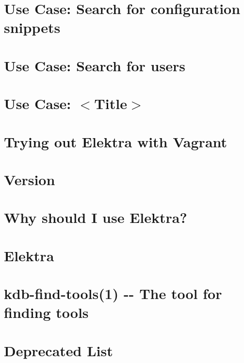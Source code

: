 \documentclass[twoside]{book}
\newcommand{\+}{\discretionary{\mbox{\scriptsize$\hookleftarrow$}}{}{}}
\begin{document}
\chapter{Use Case\+: Search for configuration snippets}
\label{doc_usecases_snippet_sharing_UC_search_snippet_md}

\chapter{Use Case\+: Search for users}
\label{doc_usecases_snippet_sharing_UC_search_user_md}

\chapter{Use Case\+: $<$Title$>$}
\label{doc_usecases_template_md}

\chapter{Trying out Elektra with Vagrant}
\label{doc_vagrant_README_md}

\chapter{Version}
\label{doc_VERSION_md}

\chapter{Why should I use Elektra?}
\label{doc_WHY_md}

\chapter{Elektra}
\label{README_md}

\chapter{kdb-\/find-\/tools(1) -\/-\/ The tool for finding tools}
\label{md_scripts_README}

\chapter{Deprecated List}
\label{deprecated}

\end{document}
